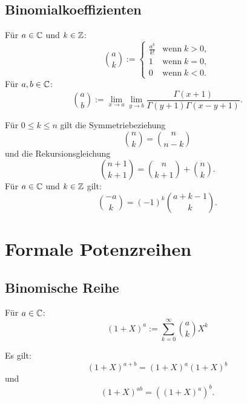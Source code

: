 \subsection{Binomialkoeffizienten}
\begin{Definition}
Für $a\in\mathbb C$ und $k\in\mathbb Z$:
\begin{equation}
\binom{a}{k} := \begin{cases}
\frac{a^{\underline k}}{k!} & \text{wenn}\;k>0,\\
1 & \text{wenn}\;k=0,\\
0 & \text{wenn}\;k<0.
\end{cases}
\end{equation}
Für $a,b\in\mathbb C$:
\begin{equation}\label{eq:bc-allg}
\binom{a}{b} := \lim_{x\to a}\lim_{y\to b}
\frac{\Gamma(x+1)}{\Gamma(y+1)\Gamma(x-y+1)}.
\end{equation}
\end{Definition}
\noindent
Für $0\le k\le n$ gilt die Symmetriebeziehung
\begin{equation}
\binom{n}{k} = \binom{n}{n-k}
\end{equation}
und die Rekursionsgleichung
\begin{equation}
\binom{n+1}{k+1} = \binom{n}{k+1}+\binom{n}{k}.
\end{equation}
Für $a\in\mathbb C$ und $k\in\mathbb Z$ gilt:
\begin{equation}
\binom{-a}{k} = (-1)^k \binom{a+k-1}{k}.
\end{equation}

\section{Formale Potenzreihen}
\subsection{Binomische Reihe}
\begin{Definition}
Für $a\in\mathbb C$:
\begin{equation}
(1+X)^a := \sum_{k=0}^\infty \binom{a}{k} X^k
\end{equation}
\end{Definition}
\noindent
Es gilt:
\begin{equation}
(1+X)^{a+b} = (1+X)^a (1+X)^b 
\end{equation}
und
\begin{equation}
(1+X)^{ab} = ((1+X)^a)^b.
\end{equation}
